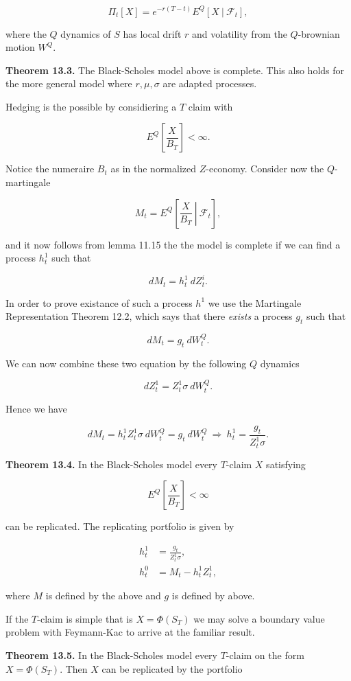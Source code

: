 \documentclass[
]{article}
\begin{document}
\[
\Pi_t[X]=e^{-r(T-t)}E^Q[X\ \vert\ \mathcal{F}_t],
\]

where the \(Q\) dynamics of \(S\) has local drift \(r\) and volatility
from the \(Q\)-brownian motion \(W^Q\).

\textbf{Theorem 13.3.} The Black-Scholes model above is complete. This
also holds for the more general model where \(r,\mu,\sigma\) are adapted
processes.

Hedging is the possible by considiering a \(T\) claim with

\[
E^Q\left[\frac{X}{B_T}\right]<\infty.
\]

Notice the numeraire \(B_t\) as in the normalized \(Z\)-economy.
Consider now the \(Q\)-martingale

\[
M_t=E^Q\left[\left. \frac{X}{B_T}\ \right\vert\ \mathcal{F}_t\right],
\]

and it now follows from lemma 11.15 the the model is complete if we can
find a process \(h_t^1\) such that

\[
dM_t=h_t^1\ dZ_t^i.
\]

In order to prove existance of such a process \(h^1\) we use the
Martingale Representation Theorem 12.2, which says that there
\emph{exists} a process \(g_t\) such that

\[
dM_t=g_t\ dW_t^Q.
\]

We can now combine these two equation by the following \(Q\) dynamics

\[
dZ_t^1=Z_t^1\sigma\ dW_t^Q.
\]

Hence we have

\[
dM_t=h_t^1Z_t^1\sigma\ dW_t^Q=g_t\ dW_t^Q\ \Rightarrow\ h_t^1=\frac{g_t}{Z_t^1\sigma}.
\]

\textbf{Theorem 13.4.} In the Black-Scholes model every \(T\)-claim
\(X\) satisfying

\[
E^Q\left[\frac{X}{B_T}\right]<\infty
\]

can be replicated. The replicating portfolio is given by

\begin{align*}
h_t^1&=\frac{g_t}{Z_t^1\sigma},\\
h_t^0&=M_t-h_t^1Z_t^1,
\end{align*}

where \(M\) is defined by the above and \(g\) is defined by above.

If the \(T\)-claim is simple that is \(X=\Phi(S_T)\) we may solve a
boundary value problem with Feymann-Kac to arrive at the familiar
result.

\textbf{Theorem 13.5.} In the Black-Scholes model every \(T\)-claim on
the form \(X=\Phi(S_T)\). Then \(X\) can be replicated by the portfolio
\end{document}
